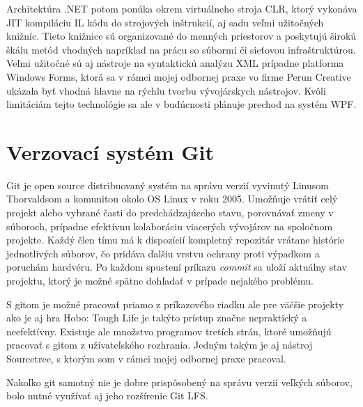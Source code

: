 \documentclass[slovak,bachelorpractice]{diploma}
\begin{document}
Architektúra .NET \cite{CSharpLang} potom ponúka okrem virtuálneho stroja CLR, ktorý vykonáva JIT kompiláciu IL kódu do strojových inštrukcií, aj sadu veľmi užitočných knižníc. Tieto knižnice sú organizované do menných priestorov a poskytujú širokú škálu metód vhodných napríklad na prácu so súbormi či sieťovou infraštruktúrou. Veľmi užitočné sú aj nástroje na syntaktickú analýzu XML prípadne platforma Windows Forms, ktorá sa v rámci mojej odbornej praxe vo firme Perun Creative ukázala byť vhodná hlavne na rýchlu tvorbu vývojárskych nástrojov. Kvôli limitáciám tejto technológie sa ale v budúcnosti plánuje prechod na systém WPF.
\section{Verzovací systém Git}
\label{sec:Git}
Git \cite{ProGit} je open source distribuovaný systém na správu verzií vyvinutý Linusom Thorvaldsom a komunitou okolo OS Linux v roku 2005. Umožňuje vrátiť celý projekt alebo vybrané časti do predchádzajúceho stavu, porovnávať zmeny v súboroch, prípadne efektívnu kolaboráciu viacerých vývojárov na spoločnom projekte. Každý člen tímu má k dispozícií kompletný repozitár vrátane histórie jednotlivých súborov, čo pridáva ďalšiu vrstvu ochrany proti výpadkom a poruchám hardvéru. Po každom spustení príkazu \textit{commit} sa uloží aktuálny stav projektu, ktorý je možné spätne dohľadať v prípade nejakého problému.

S gitom je možné pracovať priamo z príkazového riadku ale pre väčšie projekty ako je aj hra Hobo: Tough Life je takýto prístup značne nepraktický a neefektívny. Existuje ale množstvo programov tretích strán, ktoré umožňujú pracovať s gitom z užívateľského rozhrania. Jedným takým je aj nástroj Sourcetree, s ktorým som v rámci mojej odbornej praxe pracoval.

Nakoľko git samotný nie je dobre prispôsobený na správu verzií veľkých súborov, bolo nutné využívať aj jeho rozšírenie Git LFS. 
\end{document}
